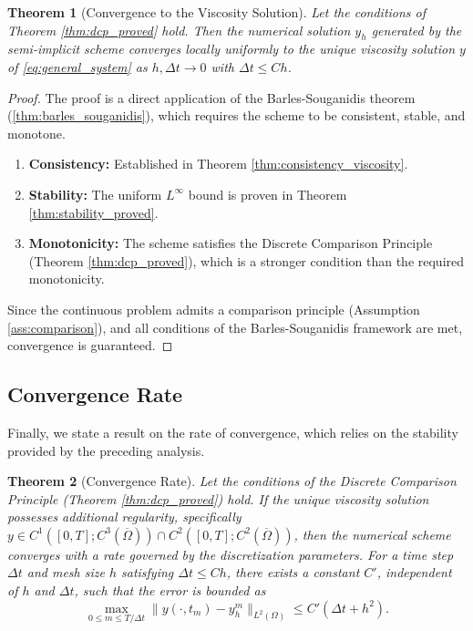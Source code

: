\documentclass[pdflatex,sn-mathphys-num]{sn-jnl}%
\theoremstyle{thmstyleone}%
\newtheorem{thm}{Theorem}[section]
\numberwithin{equation}{section}
\begin{document}
\begin{thm}[Convergence to the Viscosity Solution]
\label{thm:convergence}
Let the conditions of Theorem \ref{thm:dcp_proved} hold. Then the numerical solution $y_h$ generated by the semi-implicit scheme converges locally uniformly to the unique viscosity solution $y$ of \eqref{eq:general_system} as $h, \Delta t \to 0$ with $\Delta t \le Ch$.
\end{thm}
\begin{proof}
The proof is a direct application of the Barles-Souganidis theorem (\ref{thm:barles_souganidis}), which requires the scheme to be consistent, stable, and monotone.
\begin{enumerate}
    \item \textbf{Consistency:} Established in Theorem \ref{thm:consistency_viscosity}.
    \item \textbf{Stability:} The uniform $L^\infty$ bound is proven in Theorem \ref{thm:stability_proved}.
    \item \textbf{Monotonicity:} The scheme satisfies the Discrete Comparison Principle (Theorem \ref{thm:dcp_proved}), which is a stronger condition than the required monotonicity.
\end{enumerate}
Since the continuous problem admits a comparison principle (Assumption \ref{ass:comparison}), and all conditions of the Barles-Souganidis framework are met, convergence is guaranteed.
\end{proof}

\subsection{Convergence Rate}

Finally, we state a result on the rate of convergence, which relies on the stability provided by the preceding analysis.

\begin{thm}[Convergence Rate]
\label{thm:convergence_rate_narrative}
Let the conditions of the Discrete Comparison Principle (Theorem \ref{thm:dcp_proved}) hold. If the unique viscosity solution possesses additional regularity, specifically $y \in C^1([0,T]; C^3(\overline{\Omega})) \cap C^2([0,T]; C^2(\overline{\Omega}))$, then the numerical scheme converges with a rate governed by the discretization parameters. For a time step $\Delta t$ and mesh size $h$ satisfying $\Delta t \le Ch$, there exists a constant $C'$, independent of $h$ and $\Delta t$, such that the error is bounded as
\[
\max_{0 \le m \le T/\Delta t} \| y(\cdot, t_m) - y_h^m \|_{L^2(\Omega)} \leq C' (\Delta t + h^2).
\]
\end{thm}
\end{document}
